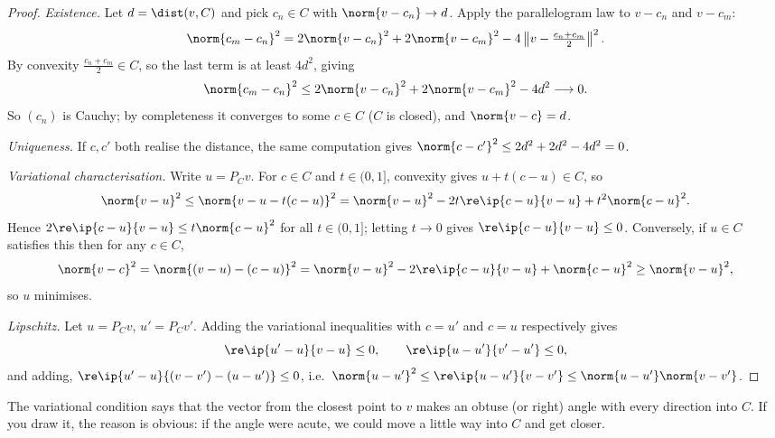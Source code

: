 \begin{proof}
	\emph{Existence.} Let $d = \dist(v,C)$ and pick $c_n \in C$ with $\norm{v - c_n}\to d$. Apply the parallelogram law to $v - c_n$ and $v - c_m$:
	$$\norm{c_m - c_n}^2 = 2\norm{v-c_n}^2 + 2\norm{v-c_m}^2 - 4\left\|v - \tfrac{c_n+c_m}{2}\right\|^2.$$
	By convexity $\frac{c_n+c_m}{2} \in C$, so the last term is at least $4d^2$, giving
	$$\norm{c_m-c_n}^2 \leq 2\norm{v-c_n}^2 + 2\norm{v-c_m}^2 - 4d^2 \longrightarrow 0.$$
	So $(c_n)$ is Cauchy; by completeness it converges to some $c \in C$ ($C$ is closed), and $\norm{v-c}=d$.

	\emph{Uniqueness.} If $c, c'$ both realise the distance, the same computation gives $\norm{c-c'}^2 \leq 2d^2+2d^2-4d^2 = 0$.

	\emph{Variational characterisation.} Write $u = P_Cv$. For $c \in C$ and $t \in (0,1]$, convexity gives $u + t(c-u) \in C$, so
	$$\norm{v-u}^2 \leq \norm{v - u - t(c-u)}^2 = \norm{v-u}^2 - 2t\re\ip{c-u}{v-u} + t^2\norm{c-u}^2.$$
	Hence $2\re\ip{c-u}{v-u} \leq t\norm{c-u}^2$ for all $t \in (0,1]$; letting $t \to 0$ gives $\re\ip{c-u}{v-u}\leq0$. Conversely, if $u \in C$ satisfies this then for any $c \in C$,
	$$\norm{v-c}^2 = \norm{(v-u)-(c-u)}^2 = \norm{v-u}^2 - 2\re\ip{c-u}{v-u}+\norm{c-u}^2 \geq \norm{v-u}^2,$$
	so $u$ minimises.

	\emph{Lipschitz.} Let $u = P_Cv$, $u' = P_Cv'$. Adding the variational inequalities with $c = u'$ and $c = u$ respectively gives
	$$\re\ip{u'-u}{v-u} \leq 0, \qquad \re\ip{u-u'}{v'-u'}\leq 0,$$
	and adding, $\re\ip{u'-u}{(v-v')-(u-u')}\leq0$, i.e.\ $\norm{u-u'}^2 \leq \re\ip{u-u'}{v-v'}\leq \norm{u-u'}\norm{v-v'}$.
\end{proof}

The variational condition says that the vector from the closest point to $v$ makes an obtuse (or right) angle with every direction into $C$. If you draw it, the reason is obvious: if the angle were acute, we could move a little way into $C$ and get closer.

\begin{center}
\end{center}

